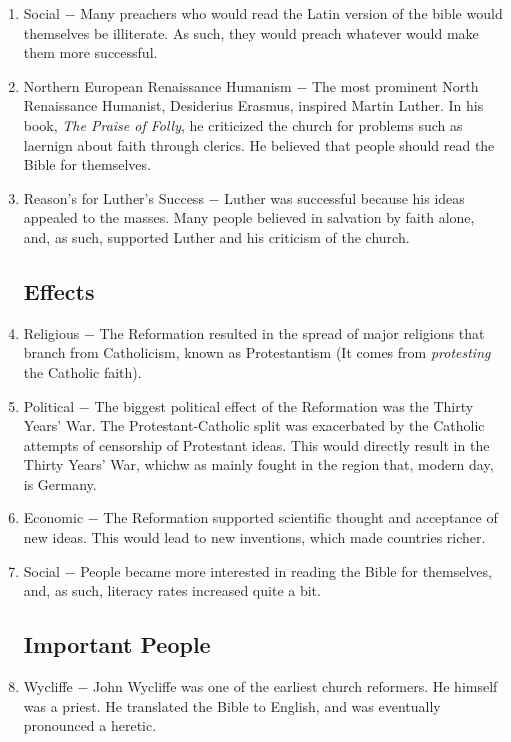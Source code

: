 \documentclass[12pt]{article}
\begin{document}
\begin{enumerate}
\item Social $-$ Many preachers who would read the Latin version of the bible would themselves be illiterate. As such, they would preach whatever would make them more successful.

\item Northern European Renaissance Humanism $-$ The most prominent North Renaissance Humanist, Desiderius Erasmus, inspired Martin Luther. In his book, \textit{The Praise of Folly}, he criticized the church for problems such as laernign about faith through clerics. He believed that people should read the Bible for themselves.

\item Reason's for Luther's Success $-$ Luther was successful because his ideas appealed to the masses. Many people believed in salvation by faith alone, and, as such, supported Luther and his criticism of the church.

\subsection{Effects}

\item Religious $-$ The Reformation resulted in the spread of major religions that branch from Catholicism, known as Protestantism (It comes from \textit{protesting} the Catholic faith).

\item Political $-$ The biggest political effect of the Reformation was the Thirty Years' War. The Protestant-Catholic split was exacerbated by the Catholic attempts of censorship of Protestant ideas. This would directly result in the Thirty Years' War, whichw as mainly fought in the region that, modern day, is Germany.

\item Economic $-$ The Reformation supported scientific thought and acceptance of new ideas. This would lead to new inventions, which made countries richer.

\item Social $-$ People became more interested in reading the Bible for themselves, and, as such, literacy rates increased quite a bit.

\subsection{Important People}

\item Wycliffe $-$ John Wycliffe was one of the earliest church reformers. He himself was a priest. He translated the Bible to English, and was eventually pronounced a heretic.


\end{enumerate}
\end{document}

